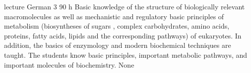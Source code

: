 {lecture}
{German}
{3}
{90 h}
{Basic knowledge of the structure of biologically relevant macromolecules as well as mechanistic and regulatory basic principles of metabolism (biosyntheses of sugars , complex carbohydrates, amino acids, proteins, fatty acids, lipids and the corresponding pathways) of eukaryotes. In addition, the basics of enzymology and modern biochemical techniques are taught.}
{The students know basic principles, important metabolic pathways, and important molecules of biochemistry.}
{None}